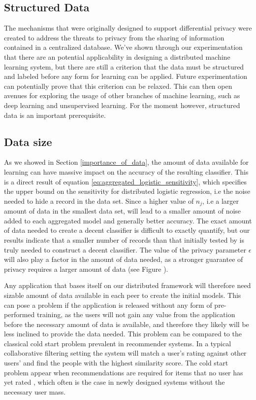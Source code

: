 \subsection{Structured Data}
The mechanisms that were originally designed to support differential privacy were created to address the threats to privacy from the sharing of information contained in a centralized database. We've shown through our experimentation that there are an potential applicability in designing a distributed machine learning system, but there are still a criterion that the data must be structured and labeled before any form for learning can be applied. Future experimentation can potentially prove that this criterion can be relaxed. This can then open avenues for exploring the usage of other branches of machine learning, such as deep learning and unsupervised learning. For the moment however, structured data is an important prerequisite.

\subsection{Data size}
As we showed in Section \ref{importance_of_data}, the amount of data available for learning can have massive impact on the accuracy of the resulting classifier. This is a direct result of equation \ref{eq:aggregated_logistic_sensitivity}, which specifies the upper bound on the sensitivity for distributed logistic regression, i.e the noise needed to hide a record in the data set. Since a higher value of $n_j$, i.e a larger amount of data in the smallest data set, will lead to a smaller amount of noise added to each aggregated model and generally better accuracy. The exact amount of data needed to create a decent classifier is difficult to exactly quantify, but our results indicate that a smaller number of records than that initially tested by \cite{pathak2010diffprivhomo} is truly needed to construct a decent classifier. The value of the privacy parameter $\epsilon$ will also play a factor in the amount of data needed, as a stronger guarantee of privacy requires a larger amount of data (see Figure ).

Any application that bases itself on our distributed framework will therefore need sizable amount of data available in each peer to create the initial models. This can pose a problem if the application is released without any form of pre-performed training, as the users will not gain any value from the application before the necessary amount of data is available, and therefore they likely will be less inclined to provide the data needed. This problem can be compared to the classical cold start problem prevalent in recommender systems. In a typical collaborative filtering setting the system will match a user's rating against other users' and find the people with the highest similarity score. The cold start problem appear when recommendations are required for items that no user has yet rated \citep{schein2002methods}, which often is the case in newly designed systems without the necessary user mass. 



